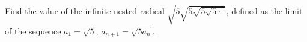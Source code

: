 Find the value of the infinite nested radical $\sqrt{5\sqrt{5\sqrt{5\sqrt{5\cdots}}}}$, defined as the limit of the sequence $a_1=\sqrt5$, $a_{n+1}=\sqrt{5a_n}$.
